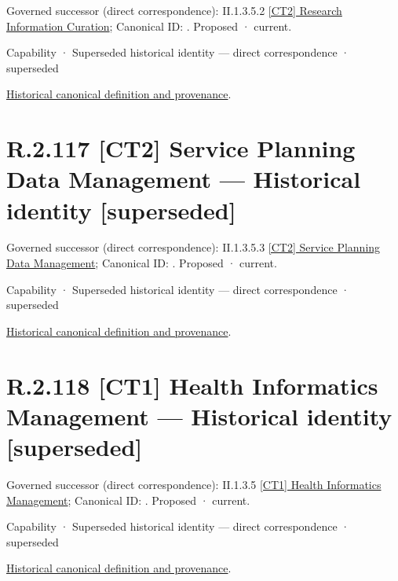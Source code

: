 {\small Governed successor (direct correspondence): II.1.3.5.2 \hyperref[element:4f5b8cec90324c2989cdc30e80bc8cb9]{[CT2] Research Information Curation}; Canonical ID: \texttt{}. Proposed · current.}\par
\label{element:11203b9c80964a9b96883eeab07f41d5}
{\small Capability · Superseded historical identity — direct correspondence · superseded}\par
\href{../../../../../../../continuum/strategy/capability/11203b9c80964a9b96883eeab07f41d5.md}{Historical canonical definition and provenance}.\par
\section*{R.2.117 [CT2] Service Planning Data Management — Historical identity [superseded]}
\label{navigation:R.2.117}

{\small Governed successor (direct correspondence): II.1.3.5.3 \hyperref[element:4873cd4b960d45d8b93560d5c8b98500]{[CT2] Service Planning Data Management}; Canonical ID: \texttt{}. Proposed · current.}\par
\label{element:19263e0802cc4b88af7a345f1410cffd}
{\small Capability · Superseded historical identity — direct correspondence · superseded}\par
\href{../../../../../../../continuum/strategy/capability/19263e0802cc4b88af7a345f1410cffd.md}{Historical canonical definition and provenance}.\par
\section*{R.2.118 [CT1] Health Informatics Management — Historical identity [superseded]}
\label{navigation:R.2.118}

{\small Governed successor (direct correspondence): II.1.3.5 \hyperref[element:a790b5f2c5a1497fa6ec09d7824da32e]{[CT1] Health Informatics Management}; Canonical ID: \texttt{}. Proposed · current.}\par
\label{element:50c56bac0dc540a2b392fc2376efc129}
{\small Capability · Superseded historical identity — direct correspondence · superseded}\par
\href{../../../../../../../continuum/strategy/capability/50c56bac0dc540a2b392fc2376efc129.md}{Historical canonical definition and provenance}.\par
